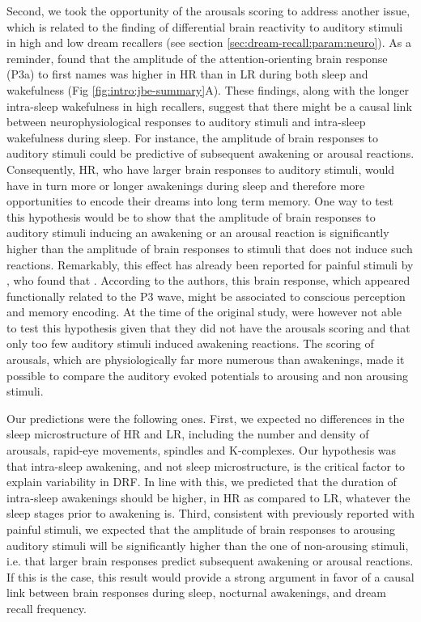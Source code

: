 Second, we took the opportunity of the arousals scoring to address another issue, which is related to the finding of differential brain reactivity to auditory stimuli in high and low dream recallers (see section \ref{sec:dream-recall:param:neuro}). As a reminder, \citet{eichenlaub_brain_2014} found that the amplitude of the attention-orienting brain response (P3a) to first names was higher in HR than in LR during both sleep and wakefulness (Fig \ref{fig:intro:jbe-summary}A). These findings, along with the longer intra-sleep wakefulness in high recallers, suggest that there might be a causal link between neurophysiological responses to auditory stimuli and intra-sleep wakefulness during sleep. For instance, the amplitude of brain responses to auditory stimuli could be predictive of subsequent awakening or arousal reactions. Consequently, HR, who have larger brain responses to auditory stimuli, would have in turn more or longer awakenings during sleep and therefore more opportunities to encode their dreams into long term memory. One way to test this hypothesis would be to show that the amplitude of brain responses to auditory stimuli inducing an awakening or an arousal reaction is significantly higher than the amplitude of brain responses to stimuli that does not induce such reactions. Remarkably, this effect has already been reported for painful stimuli by \citet{bastuji_laser_2008}, who found that . According to the authors, this brain response, which appeared functionally related to the P3 wave, might be associated to conscious perception and memory encoding. At the time of the original study, \citet{eichenlaub_brain_2014} were however not able to test this hypothesis given that they did not have the arousals scoring and that only too few auditory stimuli induced awakening reactions. The scoring of arousals, which are physiologically far more numerous than awakenings, made it possible to compare the auditory evoked potentials to arousing and non arousing stimuli.

Our predictions were the following ones. First, we expected no differences in the sleep microstructure of HR and LR, including the number and density of arousals, rapid-eye movements, spindles and K-complexes. Our hypothesis was that intra-sleep awakening, and not sleep microstructure, is the critical factor to explain variability in DRF. In line with this, we predicted that the duration of intra-sleep awakenings should be higher, in HR as compared to LR, whatever the sleep stages prior to awakening is. Third, consistent with previously reported with painful stimuli, we expected that the amplitude of brain responses to arousing auditory stimuli will be significantly higher than the one of non-arousing stimuli, i.e. that larger brain responses predict subsequent awakening or arousal reactions. If this is the case, this result would provide a strong argument in favor of a causal link between brain responses during sleep, nocturnal awakenings, and dream recall frequency.

